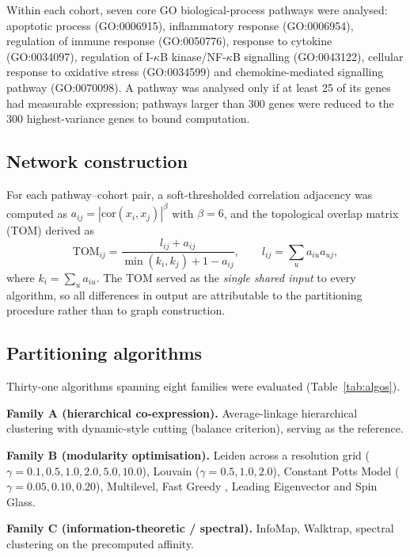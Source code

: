 \documentclass[twocolumn,11pt]{article}
\begin{document}
Within each cohort, seven core GO biological-process pathways were analysed: apoptotic
process (GO:0006915), inflammatory response (GO:0006954), regulation of immune response
(GO:0050776), response to cytokine (GO:0034097), regulation of I-$\kappa$B
kinase/NF-$\kappa$B signalling (GO:0043122), cellular response to oxidative stress
(GO:0034599) and chemokine-mediated signalling pathway (GO:0070098). A pathway was
analysed only if at least 25 of its genes had measurable expression; pathways larger than
300 genes were reduced to the 300 highest-variance genes to bound computation.

\subsection{Network construction}

For each pathway--cohort pair, a soft-thresholded correlation adjacency was computed as
$a_{ij} = |\mathrm{cor}(x_i,x_j)|^{\beta}$ with $\beta = 6$, and the topological overlap
matrix (TOM) derived as
\begin{equation}
\mathrm{TOM}_{ij} = \frac{l_{ij} + a_{ij}}{\min(k_i,k_j) + 1 - a_{ij}},
\qquad l_{ij} = \sum_u a_{iu}a_{uj},
\end{equation}
where $k_i = \sum_u a_{iu}$. The TOM served as the \emph{single shared input} to every
algorithm, so all differences in output are attributable to the partitioning procedure
rather than to graph construction.

\subsection{Partitioning algorithms}

Thirty-one algorithms spanning eight families were evaluated (Table~\ref{tab:algos}).

\noindent\textbf{Family A (hierarchical co-expression).} Average-linkage hierarchical
clustering with dynamic-style cutting (balance criterion), serving as the reference.

\noindent\textbf{Family B (modularity optimisation).} Leiden across a resolution grid
($\gamma = 0.1, 0.5, 1.0, 2.0, 5.0, 10.0$), Louvain ($\gamma = 0.5, 1.0, 2.0$), Constant
Potts Model ($\gamma = 0.05, 0.10, 0.20$), Multilevel, Fast Greedy
\citep{clauset2004fastgreedy}, Leading Eigenvector and Spin Glass.

\noindent\textbf{Family C (information-theoretic / spectral).} InfoMap, Walktrap, spectral
clustering on the precomputed affinity.
\end{document}
